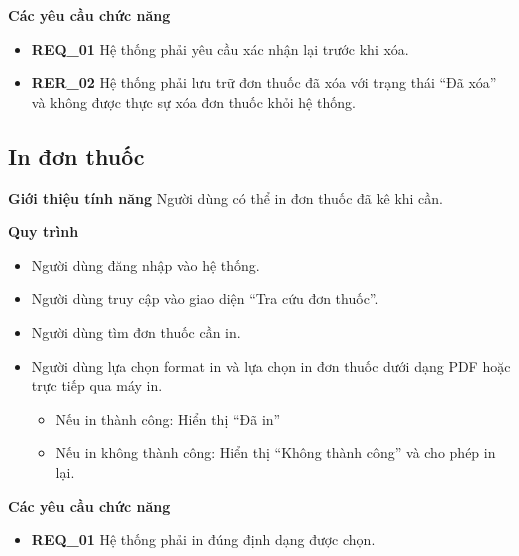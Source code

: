 \noindent \textbf{Các yêu cầu chức năng}
\begin{itemize}
    \item \textbf{REQ\_01} Hệ thống phải yêu cầu xác nhận lại trước khi xóa.
    \item \textbf{RER\_02} Hệ thống phải lưu trữ đơn thuốc đã xóa với trạng thái ``Đã xóa'' và không được thực sự xóa đơn thuốc khỏi hệ thống.
\end{itemize}

\subsection{In đơn thuốc}

\noindent \textbf{Giới thiệu tính năng}
Người dùng có thể in đơn thuốc đã kê khi cần.

\noindent \textbf{Quy trình}
\begin{itemize}
    \item Người dùng đăng nhập vào hệ thống.
    \item Người dùng truy cập vào giao diện ``Tra cứu đơn thuốc''.
    \item Người dùng tìm đơn thuốc cần in.
    \item Người dùng lựa chọn format in và lựa chọn in đơn thuốc dưới dạng PDF hoặc trực tiếp qua máy in.
    \begin{itemize}
        \item Nếu in thành công: Hiển thị ``Đã in''
        \item Nếu in không thành công: Hiển thị ``Không thành công'' và cho phép in lại.
    \end{itemize}
\end{itemize}

\noindent \textbf{Các yêu cầu chức năng}
\begin{itemize}
    \item \textbf{REQ\_01} Hệ thống phải in đúng định dạng được chọn.
\end{itemize}
